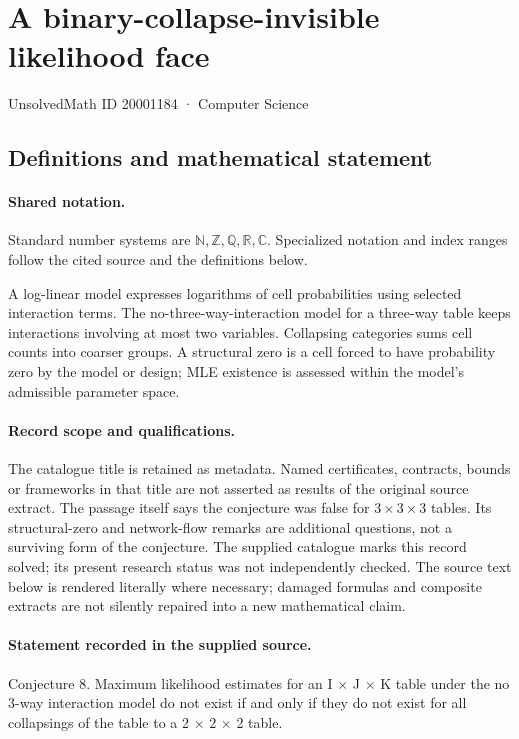\documentclass[11pt]{article}
\begin{document}
\setcounter{section}{20001183}
\section{A binary-collapse-invisible likelihood face}\label{20001184}
{\small\sffamily UnsolvedMath ID 20001184 · Computer Science}
\subsection{Definitions and mathematical statement}

\paragraph{Shared notation.}Standard number systems are $\mathbb N,\mathbb Z,\mathbb Q,\mathbb R,\mathbb C$. Specialized notation and index ranges follow the cited source and the definitions below.


A log-linear model expresses logarithms of cell probabilities using selected interaction terms. The no-three-way-interaction model for a three-way table keeps interactions involving at most two variables. Collapsing categories sums cell counts into coarser groups. A structural zero is a cell forced to have probability zero by the model or design; MLE existence is assessed within the model's admissible parameter space.
\paragraph{Record scope and qualifications.}
The catalogue title is retained as metadata. Named certificates, contracts, bounds or frameworks in that title are not asserted as results of the original source extract.
The passage itself says the conjecture was false for $3\times3\times3$ tables. Its structural-zero and network-flow remarks are additional questions, not a surviving form of the conjecture. The supplied catalogue marks this record solved; its present research status was not independently checked.
The source text below is rendered literally where necessary; damaged formulas and composite extracts are not silently repaired into a new mathematical claim.
\paragraph{Statement recorded in the supplied source.}
Conjecture 8. Maximum likelihood estimates for an I × J × K table under the no 3-way interaction model do not exist if and only if they do not exist for all collapsings of the table to a 2 × 2 × 2 table.
\end{document}
